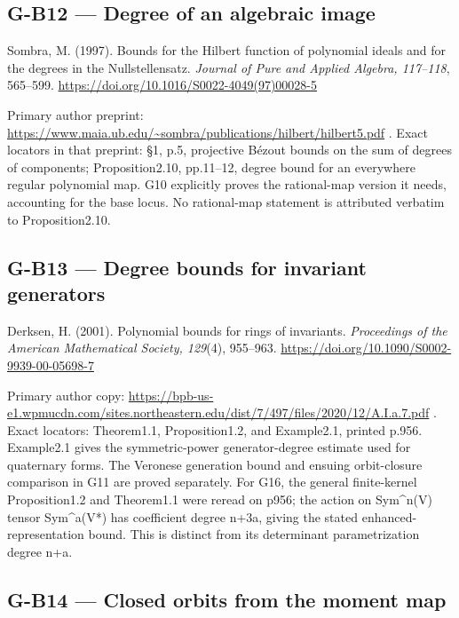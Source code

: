 \documentclass[11pt,a4paper]{article}
\theoremstyle{definition}\newtheorem{definition}{Definition}
\begin{document}
\subsection{G-B12 --- Degree of an algebraic
image}\label{g-b12--degree-of-an-algebraic-image}

Sombra, M. (1997). Bounds for the Hilbert function of polynomial ideals
and for the degrees in the Nullstellensatz. \emph{Journal of Pure and
Applied Algebra, 117--118}, 565--599.
\url{https://doi.org/10.1016/S0022-4049(97)00028-5}

Primary author preprint:
\url{https://www.maia.ub.edu/~sombra/publications/hilbert/hilbert5.pdf}
. Exact locators in that preprint: §1, p.5, projective Bézout bounds on
the sum of degrees of components; Proposition2.10, pp.11--12, degree
bound for an everywhere regular polynomial map. G10 explicitly proves
the rational-map version it needs, accounting for the base locus. No
rational-map statement is attributed verbatim to Proposition2.10.

\subsection{G-B13 --- Degree bounds for invariant
generators}\label{g-b13--degree-bounds-for-invariant-generators}

Derksen, H. (2001). Polynomial bounds for rings of invariants.
\emph{Proceedings of the American Mathematical Society, 129}(4),
955--963. \url{https://doi.org/10.1090/S0002-9939-00-05698-7}

Primary author copy:
\url{https://bpb-us-e1.wpmucdn.com/sites.northeastern.edu/dist/7/497/files/2020/12/A.I.a.7.pdf}
. Exact locators: Theorem1.1, Proposition1.2, and Example2.1, printed
p.956. Example2.1 gives the symmetric-power generator-degree estimate
used for quaternary forms. The Veronese generation bound and ensuing
orbit-closure comparison in G11 are proved separately. For G16, the
general finite-kernel Proposition1.2 and Theorem1.1 were reread on p956;
the action on Sym\^{}n(V) tensor Sym\^{}a(V*) has coefficient degree
n+3a, giving the stated enhanced-representation bound. This is distinct
from its determinant parametrization degree n+a.

\subsection{G-B14 --- Closed orbits from the moment
map}\label{g-b14--closed-orbits-from-the-moment-map}
\end{document}
